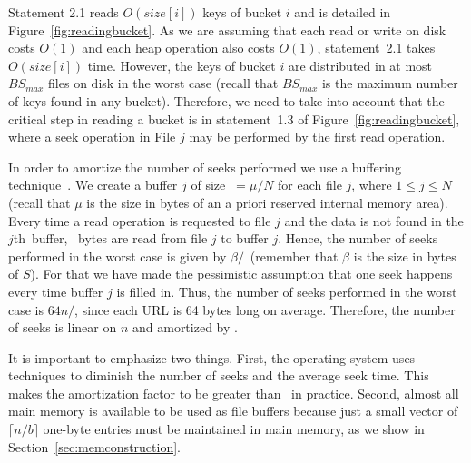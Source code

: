 Statement 2.1 reads $O(\mathit{size}[i])$ keys of bucket $i$
and is detailed in Figure~\ref{fig:readingbucket}.
As we are assuming that each read or write on disk costs $O(1)$ and
each heap operation also costs $O(1)$, statement~2.1
takes $O(\mathit{size}[i])$ time.
However, the keys of bucket $i$ are distributed in at most~$BS_{max}$ files on disk 
in the worst case
(recall that $BS_{max}$ is the maximum number of keys found in any bucket).
Therefore, we need to take into account that 
the critical step in reading a bucket is in statement~1.3 of Figure~\ref{fig:readingbucket},
where a seek operation in File $j$
may be performed by the first read operation.

In order to amortize the number of seeks performed we use a buffering technique~\cite{k73}.
We create a buffer $j$ of size \textbaht$\: = \mu/N$ for each file $j$, 
where $1\leq j \leq N$
(recall that $\mu$ is the size in bytes of an a priori reserved internal memory area).
Every time a read operation is requested to file $j$ and the data is not found 
in the $j$th~buffer, \textbaht~bytes are read from file $j$ to buffer $j$. 
Hence, the number of seeks performed in the worst case is given by
$\beta/$\textbaht~(remember that $\beta$ is the size in bytes of $S$).
For that we have made the pessimistic assumption that one seek happens every time 
buffer $j$ is filled in. 
Thus, the number of seeks performed in the worst case is $64n/$\textbaht, since
each URL is 64 bytes long on average. Therefore, the number of seeks is linear on 
$n$ and amortized by \textbaht.

It is important to emphasize two things.
First, the operating system uses techniques
to diminish the number of seeks and the average seek time. 
This makes the amortization factor to be greater than \textbaht~in practice.  
Second, almost all main memory is available to be used as
file buffers because just a small vector
of $\lceil n/b\rceil$ one-byte entries must be maintained in main memory, 
as we show in Section~\ref{sec:memconstruction}.


